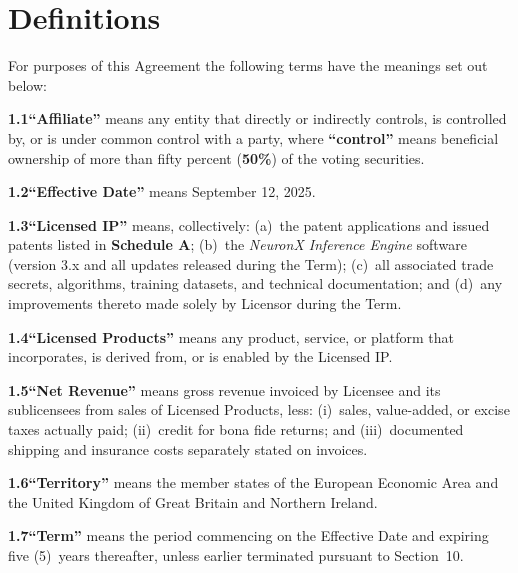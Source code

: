\documentclass[11pt,a4paper]{article}
\newcommand{\defterm}[1]{\textbf{\color{NexaNavy}``#1''}}
\begin{document}
\vspace{4pt}

\section{Definitions}

For purposes of this Agreement the following terms have the meanings set out below:

\begin{tcolorbox}[termstyle]
\setlength{\parskip}{5pt}
\small
\textbf{1.1}\enspace \defterm{Affiliate} means any entity that directly or indirectly controls,
is controlled by, or is under common control with a party, where \defterm{control} means
beneficial ownership of more than fifty percent (\textbf{50\%}) of the voting securities.

\textbf{1.2}\enspace \defterm{Effective Date} means September 12, 2025.

\textbf{1.3}\enspace \defterm{Licensed IP} means, collectively: (a)~the patent applications
and issued patents listed in \textbf{Schedule A}; (b)~the \textit{NeuronX Inference Engine}
software (version 3.x and all updates released during the Term); (c)~all associated trade
secrets, algorithms, training datasets, and technical documentation; and (d)~any improvements
thereto made solely by Licensor during the Term.

\textbf{1.4}\enspace \defterm{Licensed Products} means any product, service, or platform that
incorporates, is derived from, or is enabled by the Licensed IP.

\textbf{1.5}\enspace \defterm{Net Revenue} means gross revenue invoiced by Licensee and its
sublicensees from sales of Licensed Products, less: (i)~sales, value-added, or excise taxes
actually paid; (ii)~credit for bona fide returns; and (iii)~documented shipping and insurance
costs separately stated on invoices.

\textbf{1.6}\enspace \defterm{Territory} means the member states of the European Economic Area
and the United Kingdom of Great Britain and Northern Ireland.

\textbf{1.7}\enspace \defterm{Term} means the period commencing on the Effective Date and
expiring five (5)~years thereafter, unless earlier terminated pursuant to Section~10.
\end{tcolorbox}
\end{document}
